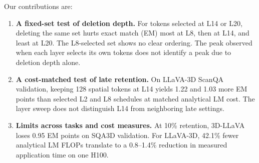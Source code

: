 Our contributions are:
\begin{enumerate}
\item \textbf{A fixed-set test of deletion depth.} For tokens selected at L14 or L20, deleting the same set hurts exact match (EM) most at L8, then at L14, and least at L20. The L8-selected set shows no clear ordering. The peak observed when each layer selects its own tokens does not identify a peak due to deletion depth alone.
\item \textbf{A cost-matched test of late retention.} On LLaVA-3D ScanQA validation, keeping 128 spatial tokens at L14 yields 1.22 and 1.03 more EM points than selected L2 and L8 schedules at matched analytical LM cost. The layer sweep does not distinguish L14 from neighboring late settings.
\item \textbf{Limits across tasks and cost measures.} At 10\% retention, 3D-LLaVA loses 0.95 EM points on SQA3D validation. For LLaVA-3D, 42.1\% fewer analytical LM FLOPs translate to a 0.8--1.4\% reduction in measured application time on one H100.
\end{enumerate}
